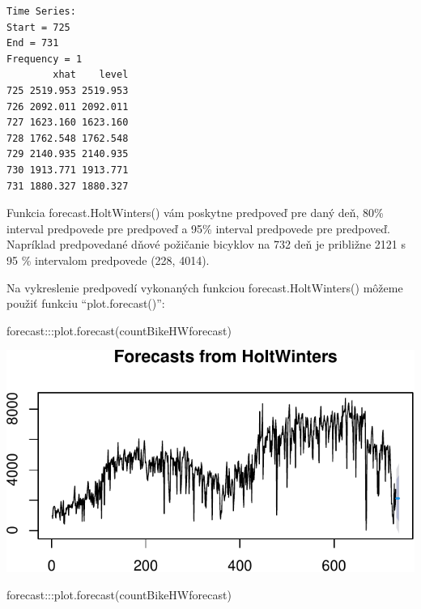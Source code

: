 \documentclass[
  letterpaper,
  DIV=11,
  numbers=noendperiod]{scrreprt}
\newenvironment{Shaded}{\begin{snugshade}}{\end{snugshade}}
\newcommand{\AttributeTok}[1]{\textcolor[rgb]{0.40,0.45,0.13}{#1}}
\newcommand{\DecValTok}[1]{\textcolor[rgb]{0.68,0.00,0.00}{#1}}
\newcommand{\FunctionTok}[1]{\textcolor[rgb]{0.28,0.35,0.67}{#1}}
\newcommand{\NormalTok}[1]{\textcolor[rgb]{0.00,0.23,0.31}{#1}}
\newcommand{\SpecialCharTok}[1]{\textcolor[rgb]{0.37,0.37,0.37}{#1}}
\begin{document}
\begin{Shaded}
\end{Shaded}

\begin{verbatim}
Time Series:
Start = 725 
End = 731 
Frequency = 1 
        xhat    level
725 2519.953 2519.953
726 2092.011 2092.011
727 1623.160 1623.160
728 1762.548 1762.548
729 2140.935 2140.935
730 1913.771 1913.771
731 1880.327 1880.327
\end{verbatim}

Funkcia forecast.HoltWinters() vám poskytne predpoveď pre daný deň, 80\%
interval predpovede pre predpoveď a 95\% interval predpovede pre
predpoveď. Napríklad predpovedané dňové požičanie bicyklov na 732 deň je
približne 2121 s 95 \% intervalom predpovede (228, 4014).

Na vykreslenie predpovedí vykonaných funkciou forecast.HoltWinters()
môžeme použiť funkciu ``plot.forecast()'':

\begin{Shaded}
\begin{Highlighting}[]
\NormalTok{forecast}\SpecialCharTok{:::}\FunctionTok{plot.forecast}\NormalTok{(countBikeHWforecast)}
\end{Highlighting}
\end{Shaded}

\includegraphics{prednaska2_HoltWinters_files/figure-pdf/unnamed-chunk-8-1.pdf}

\begin{Shaded}
\begin{Highlighting}[]
\NormalTok{forecast}\SpecialCharTok{:::}\FunctionTok{plot.forecast}\NormalTok{(countBikeHWforecast)}
\end{Highlighting}
\end{Shaded}
\end{document}
